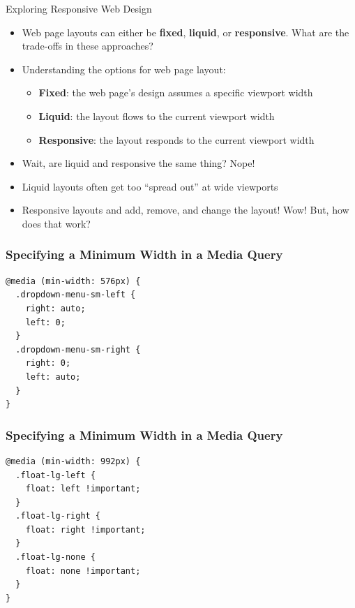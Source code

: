 \documentclass[14pt,aspectratio=169]{beamer}
\begin{document}
%
\begin{frame}{Exploring Responsive Web Design}
  \begin{itemize}
    \item Web page layouts can either be {\bf fixed}, {\bf liquid}, or {\bf
      responsive}. What are the trade-offs in these approaches?
      \vspace*{-.15in}
    \item Understanding the options for web page layout:
      \begin{itemize}
        \item {\bf Fixed}: the web page's design assumes a specific viewport width
        \item {\bf Liquid}: the layout flows to the current viewport width
        \item {\bf Responsive}: the layout responds to the current viewport
          width
      \end{itemize}
      \vspace*{-.2in}
    \item Wait, are liquid and responsive the same thing? Nope!
      \vspace*{-.2in}
    \item Liquid layouts often get too ``spread out'' at wide viewports
      \vspace*{-.2in}
    \item Responsive layouts and add, remove, and change the layout! Wow! But,
      how does that work?
  \end{itemize}
\end{frame}

%
\begin{frame}[fragile]
  \frametitle{Specifying a Minimum Width in a Media Query}
  \normalsize
  \begin{minipage}{6in}
    \vspace*{.1in}
    \begin{verbatim}
@media (min-width: 576px) {
  .dropdown-menu-sm-left {
    right: auto;
    left: 0;
  }
  .dropdown-menu-sm-right {
    right: 0;
    left: auto;
  }
}
    \end{verbatim}
  \end{minipage}
%
\end{frame}

%
\begin{frame}[fragile]
  \frametitle{Specifying a Minimum Width in a Media Query}
  \normalsize
  \begin{minipage}{6in}
    \vspace*{.1in}
    \begin{verbatim}
@media (min-width: 992px) {
  .float-lg-left {
    float: left !important;
  }
  .float-lg-right {
    float: right !important;
  }
  .float-lg-none {
    float: none !important;
  }
}
    \end{verbatim}
  \end{minipage}
%
\end{frame}
\end{document}
